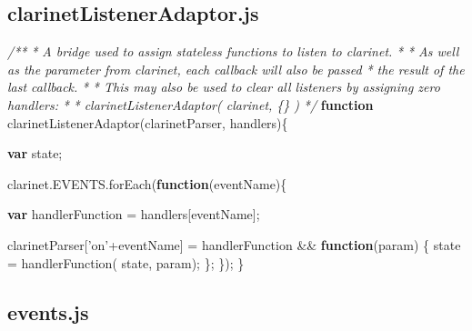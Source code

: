 \documentclass[]{article}
\newenvironment{Shaded}{}{}
\newcommand{\KeywordTok}[1]{\textcolor[rgb]{0.00,0.44,0.13}{\textbf{{#1}}}}
\newcommand{\StringTok}[1]{\textcolor[rgb]{0.25,0.44,0.63}{{#1}}}
\newcommand{\CommentTok}[1]{\textcolor[rgb]{0.38,0.63,0.69}{\textit{{#1}}}}
\newcommand{\OtherTok}[1]{\textcolor[rgb]{0.00,0.44,0.13}{{#1}}}
\newcommand{\FunctionTok}[1]{\textcolor[rgb]{0.02,0.16,0.49}{{#1}}}
\newcommand{\NormalTok}[1]{{#1}}
\begin{document}
\subsection{clarinetListenerAdaptor.js}

\begin{Shaded}
\begin{Highlighting}[]

\CommentTok{/** }
\CommentTok{ * A bridge used to assign stateless functions to listen to clarinet.}
\CommentTok{ * }
\CommentTok{ * As well as the parameter from clarinet, each callback will also be passed}
\CommentTok{ * the result of the last callback.}
\CommentTok{ * }
\CommentTok{ * This may also be used to clear all listeners by assigning zero handlers:}
\CommentTok{ * }
\CommentTok{ *    clarinetListenerAdaptor( clarinet, \{\} )}
\CommentTok{ */}
\KeywordTok{function} \FunctionTok{clarinetListenerAdaptor}\NormalTok{(clarinetParser, handlers)\{}
    
   \KeywordTok{var} \NormalTok{state;}

   \OtherTok{clarinet}\NormalTok{.}\OtherTok{EVENTS}\NormalTok{.}\FunctionTok{forEach}\NormalTok{(}\KeywordTok{function}\NormalTok{(eventName)\{}
 
      \KeywordTok{var} \NormalTok{handlerFunction = handlers[eventName];}
      
      \NormalTok{clarinetParser[}\StringTok{'on'}\NormalTok{+eventName] = handlerFunction && }
                                       \KeywordTok{function}\NormalTok{(param) \{}
                                          \NormalTok{state = }\FunctionTok{handlerFunction}\NormalTok{( state, param);}
                                       \NormalTok{\};}
   \NormalTok{\});}
\NormalTok{\}}
\end{Highlighting}
\end{Shaded}

\pagebreak

\subsection{events.js}
\end{document}
